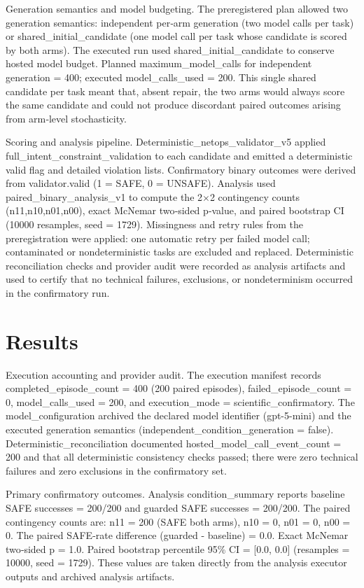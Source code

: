 \documentclass[conference]{IEEEtran}
\begin{document}
Generation semantics and model budgeting. The preregistered plan allowed two generation semantics: independent per‑arm generation (two model calls per task) or shared\_initial\_candidate (one model call per task whose candidate is scored by both arms). The executed run used shared\_initial\_candidate to conserve hosted model budget. Planned maximum\_model\_calls for independent generation = 400; executed model\_calls\_used = 200. This single shared candidate per task meant that, absent repair, the two arms would always score the same candidate and could not produce discordant paired outcomes arising from arm‑level stochasticity.

Scoring and analysis pipeline. Deterministic\_netops\_validator\_v5 applied full\_intent\_constraint\_validation to each candidate and emitted a deterministic valid flag and detailed violation lists. Confirmatory binary outcomes were derived from validator.valid (1 = SAFE, 0 = UNSAFE). Analysis used paired\_binary\_analysis\_v1 to compute the 2\ensuremath{\times}2 contingency counts (n11,n10,n01,n00), exact McNemar two‑sided p‑value, and paired bootstrap CI (10000 resamples, seed = 1729). Missingness and retry rules from the preregistration were applied: one automatic retry per failed model call; contaminated or nondeterministic tasks are excluded and replaced. Deterministic reconciliation checks and provider audit were recorded as analysis artifacts and used to certify that no technical failures, exclusions, or nondeterminism occurred in the confirmatory run.

\section{Results}
Execution accounting and provider audit. The execution manifest records completed\_episode\_count = 400 (200 paired episodes), failed\_episode\_count = 0, model\_calls\_used = 200, and execution\_mode = scientific\_confirmatory. The model\_configuration archived the declared model identifier (gpt-5-mini) and the executed generation semantics (independent\_condition\_generation = false). Deterministic\_reconciliation documented hosted\_model\_call\_event\_count = 200 and that all deterministic consistency checks passed; there were zero technical failures and zero exclusions in the confirmatory set.

Primary confirmatory outcomes. Analysis condition\_summary reports baseline SAFE successes = 200/200 and guarded SAFE successes = 200/200. The paired contingency counts are: n11 = 200 (SAFE both arms), n10 = 0, n01 = 0, n00 = 0. The paired SAFE‑rate difference (guarded - baseline) = 0.0. Exact McNemar two‑sided p = 1.0. Paired bootstrap percentile 95\% CI = [0.0, 0.0] (resamples = 10000, seed = 1729). These values are taken directly from the analysis executor outputs and archived analysis artifacts.
\end{document}
